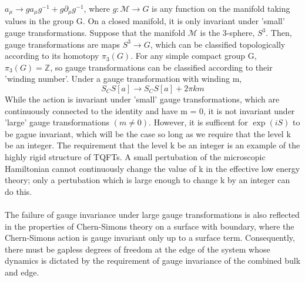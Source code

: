 $a_{\mu} \rightarrow ga_{\mu}g^{-1} + g\partial_{\mu}g^{-1}$,
where $g: \mathcal{M} \rightarrow G$ is any function on the manifold taking values in the group G. On 
a closed manifold, it is only invariant under 'small' gauge transformations. Suppose that the manifold
$\mathcal{M}$ is the 3-sphere, $S^{3}$. Then, gauge transformations are maps $S^3 \rightarrow G$, which can be classified
topologically according to its homotopy $\pi_{3}(G).$ For any simple compact group G, $\pi_{3}(G) = \mathbb{Z}$,
so gauge transformations can be classified according to their 'winding number'. Under a gauge transformation with winding m,
\begin{equation}\label{25}
 S_CS[a] \rightarrow S_CS [a] + 2\pi km
\end{equation}
While the action is invariant under 'small' gauge transformations, which are continuously connected to the identity and have m = 0,
it is not invariant under 'large' gauge transformations $(m \neq 0).$ However, it is sufficent for $\exp(iS)$ to be gague invariant,
which will be the case so long as we require that the level k be an integer. The requirement that the level k be an integer
is an example of the highly rigid structure of TQFTs. A small pertubation of the microscopic Hamiltonian cannot continuously 
change the value of k in the effective low energy theory; only a pertubation which is large enough to change k by
an integer can do this.
\paragraph{} The failure of gauge invariance under large gauge transformations is also reflected in the properties of
Chern-Simons theory on a surface with boundary, where the Chern-Simons action is gauge invariant only up to a
surface term. Consequently, there must be gapless degrees of freedom at the edge of the system whose dynamics is dictated
by the requirement of gauge invariance of the combined bulk and edge.
